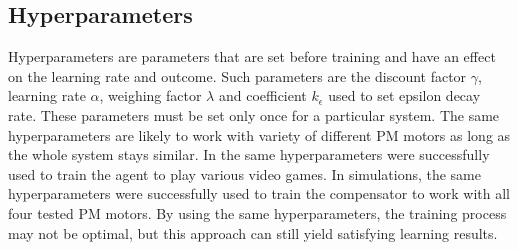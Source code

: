 \subsection{Hyperparameters} \label{hyperparameters}
Hyperparameters are parameters that are set before training and have an effect on the learning rate and outcome. Such parameters are the discount factor $\gamma$, learning rate $\alpha$, weighing factor $\lambda$ and coefficient $k_\epsilon$ used to set epsilon decay rate. These parameters must be set only once for a particular system. The same hyperparameters are likely to work with variety of different PM motors as long as the whole system stays similar. In \cite{RL:atari} the same hyperparameters were successfully used to train the agent to play various video games. In simulations, the same hyperparameters were successfully used to train the compensator to work with all four tested PM motors. By using the same hyperparameters, the training process may not be optimal, but this approach can still yield satisfying learning results.



